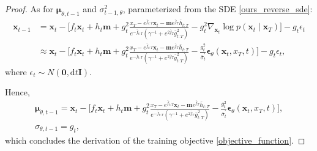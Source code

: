 \begin{proof}
As for $\boldsymbol{\mu}_{\theta,t-1}$ and $\sigma_{t-1, \theta}^2$, parameterized from the SDE \eqref{ours_reverse_sde}:
\begin{equation}
\begin{aligned}
\mathbf{x}_{t-1} &= \mathbf{x}_{t} - \Bigg[ f_t \mathbf{x}_t + h_t \mathbf{m} + g^2_t \frac{x_{T} - e^{\bar{f}_{t:T}} \mathbf{x}_t - \mathbf{m} e^{\bar{f}_{T}} \bar{h}_{t:T}}{e^{-\bar{f}_{t:T}} (\gamma^{-1} + e^{2\bar{f}_{T}} \bar{g}^2_{t:T})} - g^2_t\nabla_{\mathbf x_t}\log p(\mathbf x_t\mid \mathbf x_T) \Bigg] - g_t \epsilon_t \\
&\approx \mathbf{x}_{t} - \Bigg[ f_t \mathbf{x}_t + h_t \mathbf{m} + g^2_t  \frac{x_{T} - e^{\bar{f}_{t:T}} \mathbf{x}_t - \mathbf{m} e^{\bar{f}_{T}} \bar{h}_{t:T}}{e^{-\bar{f}_{t:T}} (\gamma^{-1} + e^{2\bar{f}_{T}} \bar{g}^2_{t:T})} - \frac{g^2_t}{\bar{\sigma}_{t}^{\prime}} \boldsymbol{\epsilon}_{\theta}(\mathbf{x}_t, x_T, t) \Bigg] - g_t \epsilon_t,
\end{aligned}
\end{equation}
where $\epsilon_t \sim N(\mathbf{0}, \mathrm{d}t \boldsymbol{I})$.

Hence, 
\begin{equation}
\begin{gathered}
\boldsymbol{\mu}_{\theta,t-1} = \mathbf{x}_{t} - \Bigg[ f_t \mathbf{x}_t + h_t \mathbf{m} + g^2_t \frac{x_{T} - e^{\bar{f}_{t:T}} \mathbf{x}_t - \mathbf{m} e^{\bar{f}_{T}} \bar{h}_{t:T}}{e^{-\bar{f}_{t:T}} (\gamma^{-1} + e^{2\bar{f}_{T}} \bar{g}^2_{t:T})} - \frac{g^2_t}{\bar{\sigma}_{t}^{\prime}} \boldsymbol{\epsilon}_{\theta}(\mathbf{x}_t, x_T, t) \Bigg], \\
\sigma_{\theta,t-1}= g_t,
\end{gathered}
\end{equation}
which concludes the derivation of the training objective \eqref{objective_function}.
\end{proof}





